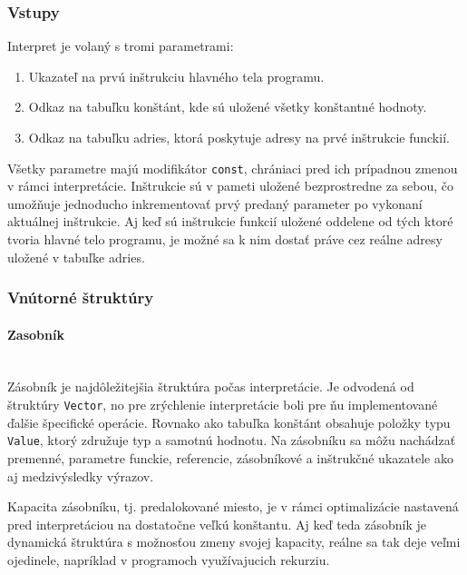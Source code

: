 \documentclass[12pt,a4paper,titlepage,final]{article}
\begin{document}
\subsubsection{Vstupy}
Interpret je volaný s tromi parametrami:
\begin{enumerate}
    \itemsep0em
    \item Ukazateľ na prvú inštrukciu hlavného tela programu.
    \item Odkaz na tabuľku konštánt, kde sú uložené všetky konštantné hodnoty.
    \item Odkaz na tabuľku adries, ktorá poskytuje adresy na prvé inštrukcie funckií.
\end{enumerate}
Všetky parametre majú modifikátor \texttt{const}, chrániaci pred ich prípadnou zmenou
v rámci interpretácie. Inštrukcie sú v pameti uložené bezprostredne za sebou, čo
umožňuje jednoducho inkrementovať prvý predaný parameter po vykonaní aktuálnej
inštrukcie. Aj keď sú inštrukcie funkcií uložené oddelene od tých ktoré tvoria hlavné
telo programu, je možné sa k nim dostať práve cez reálne adresy uložené v tabuľke adries.

\subsubsection{Vnútorné štruktúry}

\paragraph{Zasobník}\mbox{}\\

Zásobník je najdôležitejšia štruktúra počas interpretácie. Je odvodená od štruktúry
\texttt{Vector}, no pre zrýchlenie interpretácie boli pre ňu implementované ďalšie
špecifické operácie. Rovnako ako tabuľka konštánt obsahuje položky typu \texttt{Value}, 
ktorý združuje typ a samotnú hodnotu. Na zásobníku sa môžu nachádzať premenné, parametre
funckie, referencie, zásobníkové a inštrukčné ukazatele ako aj medzivýsledky výrazov.

Kapacita zásobníku, tj. predalokované miesto, je v rámci optimalizácie nastavená pred
interpretáciou na dostatočne veľkú konštantu. Aj keď teda zásobník je dynamická štruktúra
s možnosťou zmeny svojej kapacity, reálne sa tak deje veľmi ojedinele, napríklad v programoch
využívajucich rekurziu.
\end{document}
